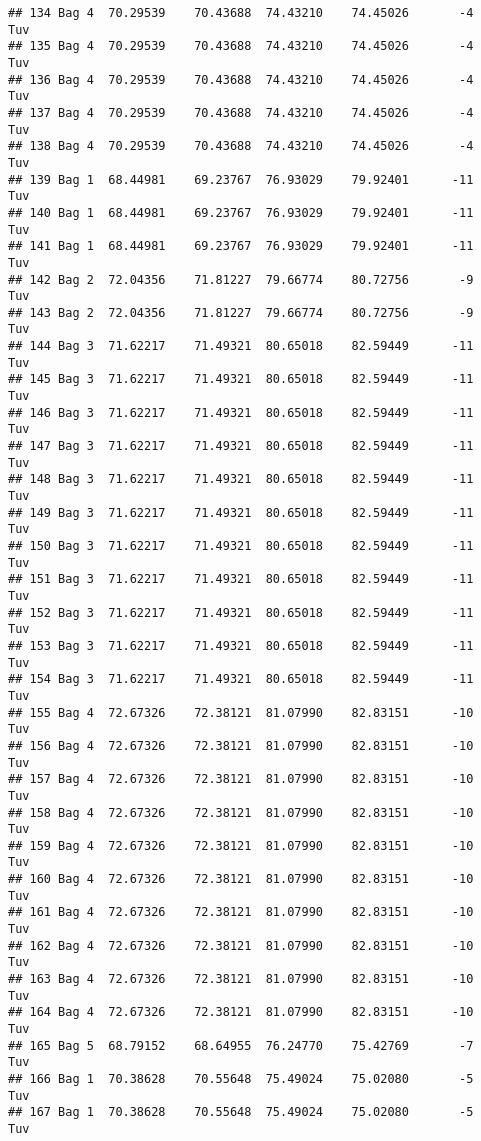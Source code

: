 \documentclass[
]{article}
\begin{document}
\begin{verbatim}
## 134 Bag 4  70.29539    70.43688  74.43210    74.45026       -4        Tuv
## 135 Bag 4  70.29539    70.43688  74.43210    74.45026       -4        Tuv
## 136 Bag 4  70.29539    70.43688  74.43210    74.45026       -4        Tuv
## 137 Bag 4  70.29539    70.43688  74.43210    74.45026       -4        Tuv
## 138 Bag 4  70.29539    70.43688  74.43210    74.45026       -4        Tuv
## 139 Bag 1  68.44981    69.23767  76.93029    79.92401      -11        Tuv
## 140 Bag 1  68.44981    69.23767  76.93029    79.92401      -11        Tuv
## 141 Bag 1  68.44981    69.23767  76.93029    79.92401      -11        Tuv
## 142 Bag 2  72.04356    71.81227  79.66774    80.72756       -9        Tuv
## 143 Bag 2  72.04356    71.81227  79.66774    80.72756       -9        Tuv
## 144 Bag 3  71.62217    71.49321  80.65018    82.59449      -11        Tuv
## 145 Bag 3  71.62217    71.49321  80.65018    82.59449      -11        Tuv
## 146 Bag 3  71.62217    71.49321  80.65018    82.59449      -11        Tuv
## 147 Bag 3  71.62217    71.49321  80.65018    82.59449      -11        Tuv
## 148 Bag 3  71.62217    71.49321  80.65018    82.59449      -11        Tuv
## 149 Bag 3  71.62217    71.49321  80.65018    82.59449      -11        Tuv
## 150 Bag 3  71.62217    71.49321  80.65018    82.59449      -11        Tuv
## 151 Bag 3  71.62217    71.49321  80.65018    82.59449      -11        Tuv
## 152 Bag 3  71.62217    71.49321  80.65018    82.59449      -11        Tuv
## 153 Bag 3  71.62217    71.49321  80.65018    82.59449      -11        Tuv
## 154 Bag 3  71.62217    71.49321  80.65018    82.59449      -11        Tuv
## 155 Bag 4  72.67326    72.38121  81.07990    82.83151      -10        Tuv
## 156 Bag 4  72.67326    72.38121  81.07990    82.83151      -10        Tuv
## 157 Bag 4  72.67326    72.38121  81.07990    82.83151      -10        Tuv
## 158 Bag 4  72.67326    72.38121  81.07990    82.83151      -10        Tuv
## 159 Bag 4  72.67326    72.38121  81.07990    82.83151      -10        Tuv
## 160 Bag 4  72.67326    72.38121  81.07990    82.83151      -10        Tuv
## 161 Bag 4  72.67326    72.38121  81.07990    82.83151      -10        Tuv
## 162 Bag 4  72.67326    72.38121  81.07990    82.83151      -10        Tuv
## 163 Bag 4  72.67326    72.38121  81.07990    82.83151      -10        Tuv
## 164 Bag 4  72.67326    72.38121  81.07990    82.83151      -10        Tuv
## 165 Bag 5  68.79152    68.64955  76.24770    75.42769       -7        Tuv
## 166 Bag 1  70.38628    70.55648  75.49024    75.02080       -5        Tuv
## 167 Bag 1  70.38628    70.55648  75.49024    75.02080       -5        Tuv

\end{verbatim}
\end{document}
